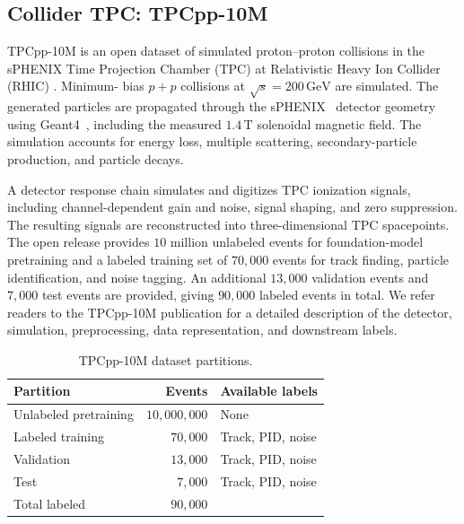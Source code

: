 \subsection{Collider TPC: TPCpp-10M}

  TPCpp-10M is an open dataset of simulated proton--proton collisions in the sPHENIX Time Projection Chamber (TPC) at Relativistic Heavy Ion Collider (RHIC) \citep{tpcpp10m}. Minimum-
  bias \(p+p\) collisions at \(\sqrt{s}=200\,\mathrm{GeV}\) are simulated. The generated
  particles are propagated through the sPHENIX~\citep{klest2022compacttpc} detector geometry using {Geant4}~\citep{geant4}, including the measured \(1.4\,\mathrm{T}\) solenoidal
  magnetic field. The simulation accounts for energy loss, multiple scattering, secondary-particle production, and particle decays.

  A detector response chain simulates and digitizes TPC ionization signals, including channel-dependent gain and noise, signal shaping, and zero
  suppression. The resulting signals are reconstructed into three-dimensional TPC spacepoints. The open release provides \(10\) million unlabeled events for
  foundation-model pretraining and a labeled training set of \(70{,}000\) events for track finding, particle identification, and noise tagging. An
  additional \(13{,}000\) validation events and \(7{,}000\) test events are provided, giving \(90{,}000\) labeled events in total. We refer readers to the
  TPCpp-10M publication for a detailed description of the detector, simulation, preprocessing, data representation, and downstream labels.

  \begin{table}[h!]
      \centering
      \caption{TPCpp-10M dataset partitions.}
      \label{tab:tpcpp-splits}
      \small
      \begin{tabular}{@{}lrl@{}}
          \toprule
          Partition & Events & Available labels \\
          \midrule
          Unlabeled pretraining & \(10{,}000{,}000\) & None \\
          Labeled training      & \(70{,}000\)       & Track, PID, noise \\
          Validation            & \(13{,}000\)       & Track, PID, noise \\
          Test                  & \(7{,}000\)        & Track, PID, noise \\
          \midrule
          Total labeled         & \({90{,}000}\) & \\
          \bottomrule
      \end{tabular}
  \end{table}
  
